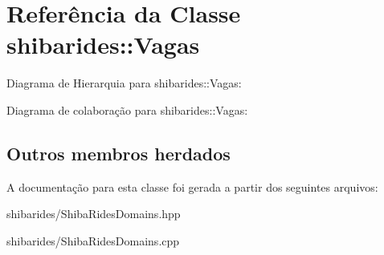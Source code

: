 \hypertarget{classshibarides_1_1Vagas}{}\section{Referência da Classe shibarides\+:\+:Vagas}
\label{classshibarides_1_1Vagas}


Diagrama de Hierarquia para shibarides\+:\+:Vagas\+:


Diagrama de colaboração para shibarides\+:\+:Vagas\+:
\subsection*{Outros membros herdados}


A documentação para esta classe foi gerada a partir dos seguintes arquivos\+:\begin{DoxyCompactItemize}
\item 
shibarides/Shiba\+Rides\+Domains.\+hpp\item 
shibarides/Shiba\+Rides\+Domains.\+cpp\end{DoxyCompactItemize}
